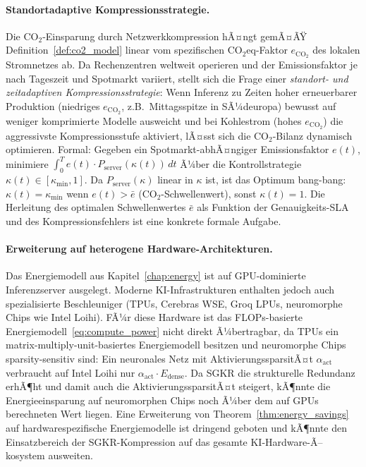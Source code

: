 ﻿\documentclass[12pt, a4paper, openany]{report}
\begin{document}
\paragraph{Standortadaptive Kompressionsstrategie.}
Die CO$_2$-Einsparung durch Netzwerkkompression hÃ¤ngt gemÃ¤ÃŸ
Definition~\ref{def:co2_model} linear vom spezifischen CO$_2$eq-Faktor
$e_{\mathrm{CO_2}}$ des lokalen Stromnetzes ab.  Da Rechenzentren weltweit
operieren und der Emissionsfaktor je nach Tageszeit und Spotmarkt variiert,
stellt sich die Frage einer \emph{standort- und zeitadaptiven
Kompressionsstrategie}: Wenn Inferenz zu Zeiten hoher erneuerbarer
Produktion (niedriges $e_{\mathrm{CO_2}}$, z.B.\ Mittagsspitze in
SÃ¼deuropa) bewusst auf weniger komprimierte Modelle ausweicht und bei
Kohlestrom (hohes $e_{\mathrm{CO_2}}$) die aggressivste Kompressionsstufe
aktiviert, lÃ¤sst sich die CO$_2$-Bilanz dynamisch optimieren.
Formal: Gegeben ein Spotmarkt-abhÃ¤ngiger Emissionsfaktor $e(t)$, minimiere
$\int_0^T e(t) \cdot P_{\mathrm{server}}(\kappa(t)) \,dt$ Ã¼ber die
Kontrollstrategie $\kappa(t) \in [\kappa_{\min}, 1]$.  Da
$P_{\mathrm{server}}(\kappa)$ linear in $\kappa$ ist, ist das Optimum
bang-bang: $\kappa(t) = \kappa_{\min}$ wenn $e(t) > \bar{e}$ (CO$_2$-Schwellenwert),
sonst $\kappa(t) = 1$.  Die Herleitung des optimalen Schwellenwertes $\bar{e}$
als Funktion der Genauigkeits-SLA und des Kompressionsfehlers ist eine
konkrete formale Aufgabe.

\paragraph{Erweiterung auf heterogene Hardware-Architekturen.}
Das Energiemodell aus Kapitel~\ref{chap:energy} ist auf GPU-dominierte
Inferenzserver ausgelegt.  Moderne KI-Infrastrukturen enthalten jedoch auch
spezialisierte Beschleuniger (TPUs, Cerebras WSE, Groq LPUs, neuromorphe
Chips wie Intel Loihi).  FÃ¼r diese Hardware ist das FLOPs-basierte
Energiemodell~\eqref{eq:compute_power} nicht direkt Ã¼bertragbar, da
TPUs ein matrix-multiply-unit-basiertes Energiemodell besitzen und
neuromorphe Chips sparsity-sensitiv sind: Ein neuronales Netz mit
AktivierungssparsitÃ¤t $\alpha_{\mathrm{act}}$ verbraucht auf Intel Loihi
nur $\alpha_{\mathrm{act}} \cdot E_{\mathrm{dense}}$.  Da SGKR die
strukturelle Redundanz erhÃ¶ht und damit auch die AktivierungssparsitÃ¤t
steigert, kÃ¶nnte die Energieeinsparung auf neuromorphen Chips noch Ã¼ber
dem auf GPUs berechneten Wert liegen.  Eine Erweiterung von
Theorem~\ref{thm:energy_savings} auf hardware\-spezifische Energiemodelle
ist dringend geboten und kÃ¶nnte den Einsatzbereich der SGKR-Kompression
auf das gesamte KI-Hardware-Ã–kosystem ausweiten.
\end{document}
